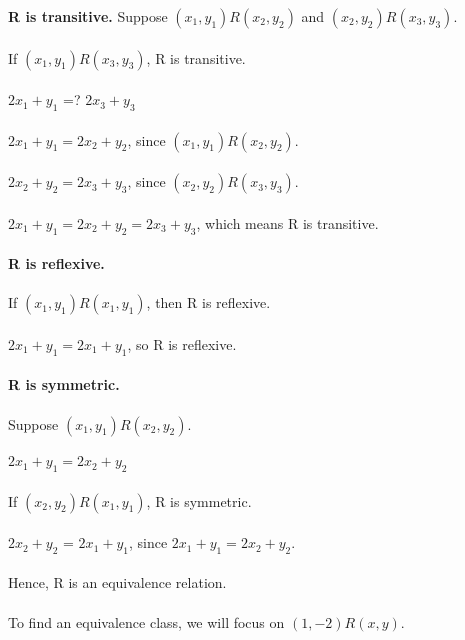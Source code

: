 \documentclass[12pt]{article}
\begin{document}
\textbf{R is transitive.} Suppose $(x_1,y_1)R(x_2,y_2)$ and $(x_2,y_2)R(x_3,y_3)$.\\\\

If $(x_1,y_1)R(x_3,y_3)$, R is transitive.\\\\

$2x_1 + y_1$ =? $ 2x_3 + y_3$\\\\
$2x_1 + y_1 = 2x_2 + y_2$, since $(x_1,y_1)R(x_2,y_2)$.\\\\
$2x_2 + y_2 = 2x_3 + y_3$, since $(x_2,y_2)R(x_3,y_3)$.\\\\

$2x_1 + y_1 = 2x_2 + y_2 = 2x_3 + y_3$, which means R is transitive.\\\\

\textbf{R is reflexive.}\\\\

If $(x_1,y_1)R(x_1,y_1)$, then R is reflexive.\\\\

$2x_1 + y_1 = 2x_1 + y_1$, so R is reflexive.\\\\

\textbf{R is symmetric.}\\\\

Suppose $(x_1,y_1)R(x_2,y_2)$.\\\\

$2x_1 + y_1 = 2x_2 + y_2$\\\\

If $(x_2,y_2)R(x_1,y_1)$, R is symmetric.\\\\

$2x_2 + y_2$ = $2x_1 + y_1$, since $2x_1 + y_1 = 2x_2 + y_2$.\\\\

Hence, R is an equivalence relation.\\\\

To find an equivalence class, we will focus on $(1,-2)R(x,y)$.\\\\
\end{document}
